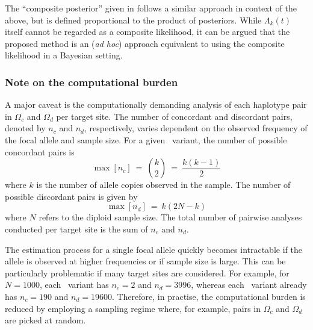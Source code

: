 The ``composite posterior'' given in  follows a similar approach in context of the above, but is defined proportional to the product of posteriors.
While ${\Lambda_k(t)}$ itself cannot be regarded as a composite likelihood, it can be argued that the proposed method is an (\emph{ad hoc}) approach equivalent to using the composite likelihood in a Bayesian setting.



%
\subsubsection{Note on the computational burden}
%

A major caveat is the computationally demanding analysis of each haplotype pair in $\Omega_c$ and $\Omega_d$ per target site.
The number of concordant and discordant pairs, denoted by $n_c$ and $n_d$, respectively, varies dependent on the observed frequency of the focal allele and sample size.
For a given \fk{}~variant, the number of possible concordant pairs is
\begin{equation}\label{eq:age_nc}
	\max[n_c] ~=~ {{k}\choose{2}} ~=~ \frac{k(k-1)}{2}
\end{equation}
where $k$ is the number of allele copies observed in the sample.
The number of possible discordant pairs is given by
\begin{equation}\label{eq:age_nd}
	\max[n_d] ~=~ k(2N-k)
\end{equation}
where $N$ refers to the diploid sample size.
The total number of pairwise analyses conducted per target site is the sum of $n_c$ and $n_d$.

The estimation process for a single focal allele quickly becomes intractable if the allele is observed at higher frequencies or if sample size is large.
This can be particularly problematic if many target sites are considered.
For example, for ${N=\num{1000}}$, each ~variant has ${n_c=2}$ and ${n_d=\num{3996}}$, whereas each ~variant already has ${n_c=\num{190}}$ and ${n_d=\num{19600}}$.
Therefore, in practise, the computational burden is reduced by employing a sampling regime where, for example, pairs in $\Omega_c$ and $\Omega_d$ are picked at random.



